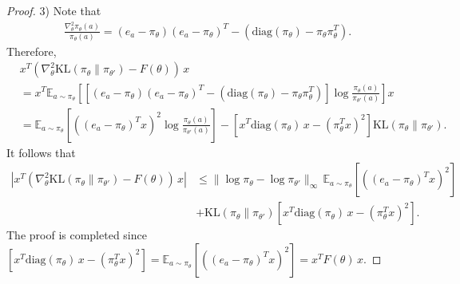 \begin{proof}
    3) Note that
    \begin{align*}
        \frac{\nabla_\theta^2\pi_\theta(a)}{\pi_\theta(a)}=(e_a-\pi_\theta)(e_a-\pi_\theta)^T-\left(\mathrm{diag}(\pi_\theta)-\pi_\theta\pi_\theta^T\right).
    \end{align*}
    Therefore,
    \begin{align*}
        &x^T\left(\nabla_\theta^2\mathrm{KL}(\pi_\theta\|\pi_{\theta'})-F(\theta)\right)\,x\\&=x^T\mathbb{E}_{a\sim\pi_\theta}\left[\left[(e_a-\pi_\theta)(e_a-\pi_\theta)^T-\left(\mathrm{diag}(\pi_\theta)-\pi_\theta\pi_\theta^T\right)\right]\log\frac{\pi_\theta(a)}{\pi_{\theta'}(a)}\right]x\\
        &=\mathbb{E}_{a\sim\pi_\theta}\left[\left((e_a-\pi_\theta)^T x\right)^2\log\frac{\pi_\theta(a)}{\pi_{\theta'}(a)}\right]-\left[x^T\mathrm{diag}(\pi_\theta)\,x-\left(\pi_\theta^Tx\right)^2\right]\mathrm{KL}(\pi_\theta\|\pi_{\theta'}).
    \end{align*}
    It follows that
    \begin{align*}
        \left|x^T\left(\nabla_\theta^2\mathrm{KL}(\pi_\theta\|\pi_{\theta'})-F(\theta)\right)\,x\right|&\leq \|\log\pi_\theta-\log\pi_{\theta'}\|_\infty \,
        \mathbb{E}_{a\sim\pi_\theta}\left[\left((e_a-\pi_\theta)^T x\right)^2\right]\\
        &+\mathrm{KL}(\pi_\theta\|\pi_{\theta'})\left[x^T\mathrm{diag}(\pi_\theta)\,x-\left(\pi_\theta^Tx\right)^2\right].
    \end{align*}
    The proof is completed since $\left[x^T\mathrm{diag}(\pi_\theta)\,x-\left(\pi_\theta^Tx\right)^2\right]=\mathbb{E}_{a\sim\pi_\theta}\left[\left((e_a-\pi_\theta)^T x\right)^2\right]=x^TF(\theta)\,x$.    
\end{proof}



